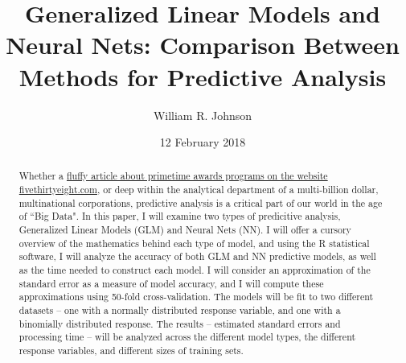 \documentclass[12pt]{article}
\begin{document}
	\title{Generalized Linear Models and Neural Nets: Comparison Between Methods for Predictive Analysis}
	\author{William R. Johnson}
	\date{12 February 2018}
	\maketitle

	\renewcommand{\abstractname}{Abstract:}
	\begin{abstract}
		Whether a \href{https://fivethirtyeight.com/features/oscars-2018-early-predictions-nominations/}{fluffy article about primetime 
awards programs on the website fivethirtyeight.com}, or deep within the analytical 
department of a multi-billion dollar, multinational corporations, predictive analysis is a critical part of our world in the age of ``Big Data".  
In this paper, I will examine two types of predicitive analysis, Generalized Linear Models (GLM) and Neural Nets (NN).  I will offer a cursory 
overview of the mathematics behind each type of model, and using the R statistical software, I will analyze the accuracy of both GLM and NN 
predictive models, as well as the time needed to construct each model. I will consider an approximation of the standard error as a measure of model 
accuracy, and I will compute these approximations using 50-fold cross-validation.  The models will be fit to two different datasets -- one with a 
normally distributed response variable, and one with a binomially distributed response.  The results -- estimated standard errors and processing 
time -- will be analyzed across the different model types, the different response variables, and different sizes of training sets.
	\end{abstract}
	\vfill\eject




\end{document}
